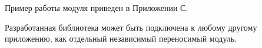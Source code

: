 \documentclass[12pt,a4paper,oneside]{article} %
\begin{document}
\begin{itemize}
\begin{figure}[h!]
\end{figure}

\end{itemize}

Пример работы модуля приведен в Приложении С.

Разработанная библиотека может быть подключена к любому другому \linebreak
приложению, как отдельный независимый переносимый модуль.

\newpage
\end{document}
